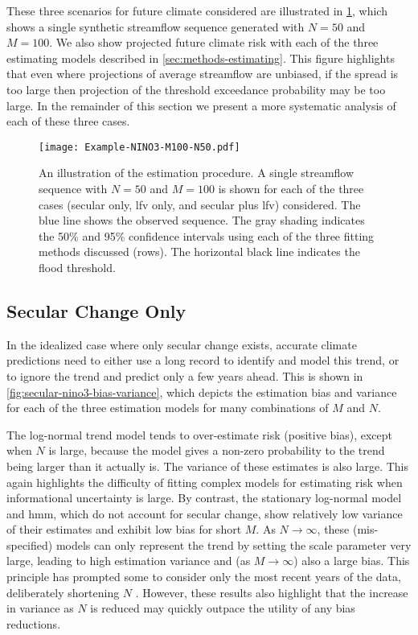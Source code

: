 \documentclass[
  draft,
  linenumbers
]{agujournal2019}
\begin{document}
These three scenarios for future climate considered are illustrated in \cref{fig:example-fit}, which shows a single synthetic streamflow sequence generated with $N=50$ and $M=100$.
We also show projected future climate risk with each of the three estimating models described in \cref{sec:methods-estimating}.
This figure highlights that even where projections of average streamflow are unbiased, if the spread is too large then projection of the threshold exceedance probability may be too large.
In the remainder of this section we present a more systematic analysis of each of these three cases.

\begin{figure}
  \texttt{[image: Example-NINO3-M100-N50.pdf]}
  \caption{
    An illustration of the estimation procedure.
    A single streamflow sequence with $N=50$ and $M=100$ is shown for each of the three cases (secular only, \gls{lfv} only, and secular plus \gls{lfv}) considered.
    The blue line shows the observed sequence.
    The gray shading indicates the 50\% and 95\% confidence intervals using each of the three fitting methods discussed (rows).
    The horizontal black line indicates the flood threshold.
  }\label{fig:example-fit}
\end{figure}

\subsection{Secular Change Only}

In the idealized case where only secular change exists, accurate climate predictions need to either use a long record to identify and model this trend, or to ignore the trend and predict only a few years ahead.
This is shown in \cref{fig:secular-nino3-bias-variance}, which depicts the estimation bias and variance for each of the three estimation models for many combinations of $M$ and $N$.

The log-normal trend model tends to over-estimate risk (positive bias), except when $N$ is large, because the model gives a non-zero probability to the trend being larger than it actually is.
The variance of these estimates is also large.
This again highlights the difficulty of fitting complex models for estimating risk when informational uncertainty is large.
By contrast, the stationary log-normal model and \gls{hmm}, which do not account for secular change, show relatively low variance of their estimates and exhibit low bias for short $M$.
As $N \rightarrow \infty$, these (mis-specified) models can only represent the trend by setting the scale parameter very large, leading to high estimation variance and (as $M \rightarrow \infty$) also a large bias.
This principle has prompted some to consider only the most recent years of the data, deliberately shortening $N$ \citep[i.e.\@\xspace,][]{Muller:2014fc}.
However, these results also highlight that the increase in variance as $N$ is reduced may quickly outpace the utility of any bias reductions.
\end{document}
